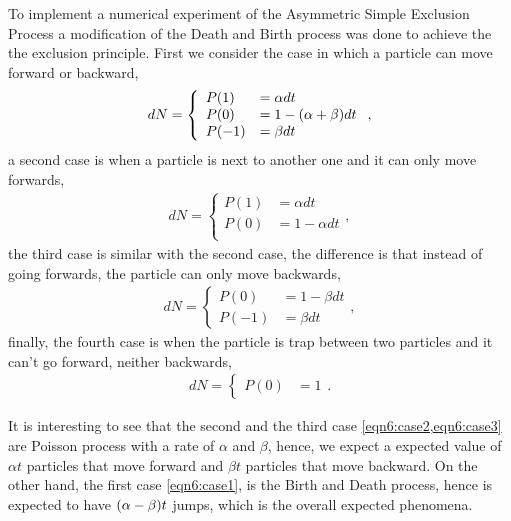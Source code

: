 \documentclass[main.tex]{subfiles}
\begin{document}
To implement a numerical experiment of the Asymmetric Simple Exclusion Process a modification of the Death and Birth process was done to achieve the the exclusion principle.
First we consider the case in which a particle can move forward or backward,
\begin{gather}
    dN = \left\{
        \begin{array}{ll}
            P(1) &= \alpha dt \\
            P(0) &= 1-\qty(\alpha+\beta) dt \\
            P(-1) &= \beta dt
        \end{array}
    \right.\label{eqn6:case1},
\end{gather}
a second case is when a particle is next to another one and it can only move forwards,
\begin{gather}
    dN = \left\{
        \begin{array}{ll}
            P(1) &= \alpha dt \\
            P(0) &= 1-\alpha dt \\
        \end{array}
    \right.\label{eqn6:case2},
\end{gather}
the third case is similar with the second case, the difference is that instead of going forwards, the particle can only move backwards,
\begin{gather}
    dN = \left\{
        \begin{array}{ll}
            P(0) &= 1-\beta dt \\
            P(-1) &= \beta dt
        \end{array}
    \right.\label{eqn6:case3},
\end{gather}
finally, the fourth case is when the particle is trap between two particles and it can't go forward, neither backwards,
\begin{gather}
    dN = \left\{
        \begin{array}{ll}
            P(0) &= 1
        \end{array}
    \right.\label{eqn6:case4}.
\end{gather}

It is interesting to see that the second and the third case \cref{eqn6:case2,eqn6:case3} are Poisson process with a rate of $\alpha$ and $\beta$, hence, we expect a expected value of $\alpha t$ particles that move forward and $\beta t$ particles that move backward.
On the other hand, the first case \cref{eqn6:case1}, is the Birth and Death process, hence is expected to have $\qty(\alpha-\beta)t$ jumps, which is the overall expected phenomena.
\end{document}
